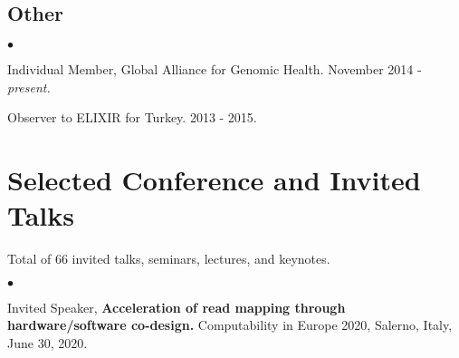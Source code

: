 \documentclass[margin,line]{res}
\newenvironment{list2}{
  \begin{list}{$\bullet$}{%
      \setlength{\itemsep}{0.1cm}
      \setlength{\parsep}{0in} \setlength{\parskip}{0in}
      \setlength{\topsep}{0in} \setlength{\partopsep}{0in} 
      \setlength{\leftmargin}{0.2in}}}{\end{list}}
\newcommand{\junk}[1]{}
\begin{document}
\begin{resume}
\vspace{-0.4cm}
\subsection{\small \sc Other}
\begin{list2}
\item
  Individual Member, Global Alliance for Genomic Health. November 2014 - {\it present.}
\item
  Observer to ELIXIR for Turkey. 2013 - 2015.
\end{list2}


\vspace*{-.2cm}
\section{\sc Selected Conference and Invited Talks}
{\small
Total of 66 invited talks, seminars, lectures, and keynotes.
}\\

\begin{list2}
\junk{
\item
  Lecture, 
      {\bf  Characterization of genomic structural variation using various sequencing technologies.}
  Clinical genomics and NGS hybrid course, European School of Genetic Medicine and Acıbadem University, İstanbul, Turkey,
  October 13, 2020.
  }
 \item
 Invited Speaker,
{\bf Acceleration of read mapping through hardware/software co-design.}
Computability in Europe 2020, Salerno, Italy, June 30, 2020.

\junk{
 \item
  Invited Speaker, 
  {\bf Characterization of large-scale structural variants using Linked-Reads.}
  Biological Databases and Data Analysis Symposium, Koç University, Turkey, September 9, 2019.
  
  \item
  Invited Speaker, 
  {\bf Characterization of large-scale structural variants using Linked-Reads.} \textit{(in Turkish)}
  Data Science Summer School 2019, Sabancı University, Turkey, September 7, 2019.
  
  
  
  \item
  Conference Talk, 
  {\bf Characterization of large-scale structural variants using Linked-Reads.}
$27^{th}$ Annual
International Conference Intelligent Systems for Molecular Biology (ISMB/ECCB 2019), {\em HiTSeq Track},
Basel, Switzerland, July 23, 2019.
}


\end{list2}
\end{resume}
\end{document}
